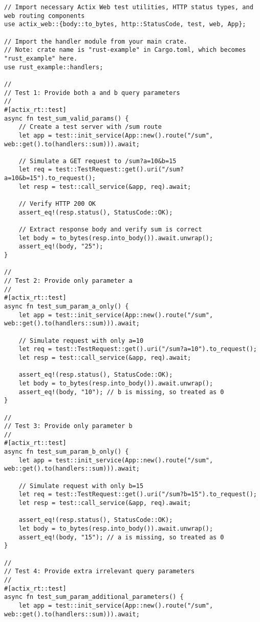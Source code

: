 \begin{lstlisting}[style=RustStyle, caption={tests/sum\_tests.rs}]
// Import necessary Actix Web test utilities, HTTP status types, and web routing components
use actix_web::{body::to_bytes, http::StatusCode, test, web, App};

// Import the handler module from your main crate.
// Note: crate name is "rust-example" in Cargo.toml, which becomes "rust_example" here.
use rust_example::handlers;

//
// Test 1: Provide both a and b query parameters
//
#[actix_rt::test]
async fn test_sum_valid_params() {
	// Create a test server with /sum route
	let app = test::init_service(App::new().route("/sum", web::get().to(handlers::sum))).await;
	
	// Simulate a GET request to /sum?a=10&b=15
	let req = test::TestRequest::get().uri("/sum?a=10&b=15").to_request();
	let resp = test::call_service(&app, req).await;
	
	// Verify HTTP 200 OK
	assert_eq!(resp.status(), StatusCode::OK);
	
	// Extract response body and verify sum is correct
	let body = to_bytes(resp.into_body()).await.unwrap();
	assert_eq!(body, "25");
}

//
// Test 2: Provide only parameter a
//
#[actix_rt::test]
async fn test_sum_param_a_only() {
	let app = test::init_service(App::new().route("/sum", web::get().to(handlers::sum))).await;
	
	// Simulate request with only a=10
	let req = test::TestRequest::get().uri("/sum?a=10").to_request();
	let resp = test::call_service(&app, req).await;
	
	assert_eq!(resp.status(), StatusCode::OK);
	let body = to_bytes(resp.into_body()).await.unwrap();
	assert_eq!(body, "10"); // b is missing, so treated as 0
}

//
// Test 3: Provide only parameter b
//
#[actix_rt::test]
async fn test_sum_param_b_only() {
	let app = test::init_service(App::new().route("/sum", web::get().to(handlers::sum))).await;
	
	// Simulate request with only b=15
	let req = test::TestRequest::get().uri("/sum?b=15").to_request();
	let resp = test::call_service(&app, req).await;
	
	assert_eq!(resp.status(), StatusCode::OK);
	let body = to_bytes(resp.into_body()).await.unwrap();
	assert_eq!(body, "15"); // a is missing, so treated as 0
}

//
// Test 4: Provide extra irrelevant query parameters
//
#[actix_rt::test]
async fn test_sum_param_additional_parameters() {
	let app = test::init_service(App::new().route("/sum", web::get().to(handlers::sum))).await;
	

\end{lstlisting}
